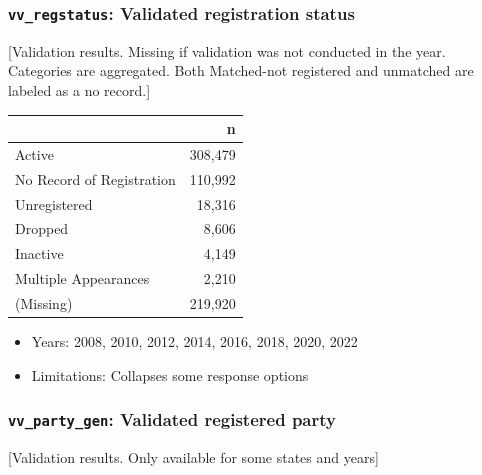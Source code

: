 \documentclass[10pt,article,oneside]{memoir}
\theoremstyle{definition}
\begin{document}
\subsubsection{\texorpdfstring{\texttt{vv\_regstatus}: Validated
registration
status}{vv\_regstatus: Validated registration status}}\label{vv_regstatus-validated-registration-status}

{[}Validation results. Missing if validation was not conducted in the
year. Categories are aggregated. Both Matched-not registered and
unmatched are labeled as a no record.{]}

\begin{table}[H]
\centering
\begin{tabular}[t]{lr}
\toprule
 & n\\
\midrule
Active & 308,479\\
No Record of Registration & 110,992\\
Unregistered & 18,316\\
Dropped & 8,606\\
Inactive & 4,149\\
Multiple Appearances & 2,210\\
(Missing) & 219,920\\
\bottomrule
\end{tabular}
\end{table}

\begin{itemize}
\tightlist
\item
  Years: 2008, 2010, 2012, 2014, 2016, 2018, 2020, 2022
\item
  Limitations: Collapses some response options
\end{itemize}

\subsubsection{\texorpdfstring{\texttt{vv\_party\_gen}: Validated
registered
party}{vv\_party\_gen: Validated registered party}}\label{vv_party_gen-validated-registered-party}

{[}Validation results. Only available for some states and years{]}
\end{document}
